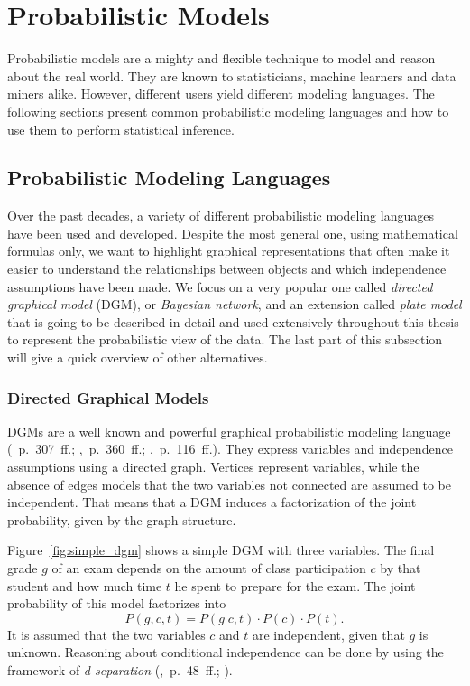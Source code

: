 \section{Probabilistic Models}

Probabilistic models are a mighty and flexible technique to model and reason about the real world. They are known to statisticians, machine learners and data miners alike. However, different users yield different modeling languages. The following sections present common probabilistic modeling languages and how to use them to perform statistical inference.

\subsection{Probabilistic Modeling Languages}

Over the past decades, a variety of different probabilistic modeling languages have been used and developed. Despite the most general one, using mathematical formulas only, we want to highlight graphical representations that often make it easier to understand the relationships between objects and which independence assumptions have been made. We focus on a very popular one called \emph{directed graphical model} (DGM), or \emph{Bayesian network}, and an extension called \emph{plate model} that is going to be described in detail and used extensively throughout this thesis to represent the probabilistic view of the data. The last part of this subsection will give a quick overview of other alternatives.

\subsubsection{Directed Graphical Models}

DGMs are a well known and powerful graphical probabilistic modeling language (\cite{murphy2012machine}~p.~307~ff.; \cite{bishop2006pattern},~p.~360~ff.; \cite{pearl1988probabilistic},~p.~116~ff.). They express variables and independence assumptions using a directed graph. Vertices represent variables, while the absence of edges models that the two variables not connected are assumed to be independent. That means that a DGM induces a factorization of the joint probability, given by the graph structure.

Figure~\ref{fig:simple_dgm} shows a simple DGM with three variables. The final grade $g$ of an exam depends on the amount of class participation $c$ by that student and how much time $t$ he spent to prepare for the exam. The joint probability of this model factorizes into $$P(g,c,t) = P(g | c, t) \cdot P(c) \cdot P(t).$$ It is assumed that the two variables $c$ and $t$ are independent, given that $g$ is unknown. Reasoning about conditional independence can be done by using the framework of \emph{d-separation}  (\cite{lauritzen1996graphical},~p.~48~ff.; \cite{pearl1988probabilistic}).

